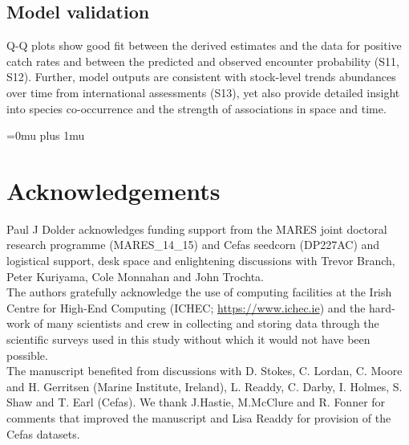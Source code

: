 \documentclass[fleqn,10pt]{wlscirep}
\begin{document}
\begin{linenumbers}
\subsection*{Model validation\\}

Q-Q plots show good fit between the derived estimates and the data for positive
catch rates and between the predicted and observed encounter probability (S11,
S12).  Further, model outputs are consistent with stock-level trends abundances
over time from international assessments (S13), yet also provide detailed
insight into species co-occurrence and the strength of associations in space
and time. \\

\end{linenumbers}
\newpage
\Urlmuskip=0mu plus 1mu\relax
%



\newpage



\section*{Acknowledgements} 
Paul J Dolder acknowledges funding support from the MARES joint doctoral
research programme (MARES\_14\_15) and Cefas seedcorn (DP227AC) and logistical
support, desk space and enlightening discussions with Trevor Branch, Peter
Kuriyama, Cole Monnahan and John Trochta.\\
	 
The authors gratefully acknowledge the use of computing facilities at the Irish
Centre for High-End Computing (ICHEC; \url{https://www.ichec.ie}) and the
hard-work of many scientists and crew in collecting and storing data through
the scientific surveys used in this study without which it would not have been
possible.  \\

The manuscript benefited from discussions with D. Stokes, C.  Lordan, C. Moore
and H. Gerritsen (Marine Institute, Ireland), L.  Readdy, C.  Darby, I. Holmes,
S. Shaw and T. Earl (Cefas). We thank J.Hastie, M.McClure and R. Fonner for
comments that improved the manuscript and Lisa Readdy for provision of the
Cefas datasets.
\end{document}
